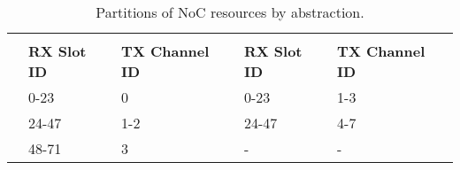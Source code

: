 
			\begin{table}[!tb]
				\centering%
				\caption{Partitions of NoC resources by abstraction.}%
				\label{tab.noc-resources}%


				\begin{tabular}{l|l|l|l|l|}
					\cline{2-5}
															& \multicolumn{2}{c|}{\textbf{\cnoc}}          & \multicolumn{2}{c|}{\textbf{\dnoc}}          \\ \cline{2-5}
															& \textbf{RX Slot ID} & \textbf{TX Channel ID} & \textbf{RX Slot ID} & \textbf{TX Channel ID} \\ \hline
					\multicolumn{1}{|l|}{\textbf{\mailbox}} & 0-23                & 0                      & 0-23                & 1-3                    \\ \hline
					\multicolumn{1}{|l|}{\textbf{\portal}}  & 24-47               & 1-2                    & 24-47               & 4-7                    \\ \hline
					\multicolumn{1}{|l|}{\textbf{\sync}}    & 48-71               & 3                      & -                   & -                      \\ \hline
				\end{tabular}

			\end{table}


